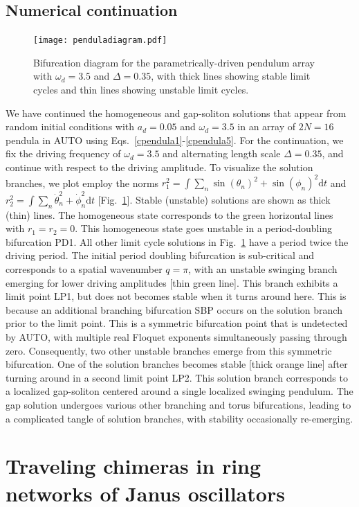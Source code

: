 \documentclass[aps,pre,amsmath,amssymb,floatfix,onecolumn,notitlepage,10pt]{revtex4-1}
\begin{document}
\subsection{Numerical continuation}
\begin{figure}[htb]
\texttt{[image: penduladiagram.pdf]}
\caption{Bifurcation diagram for the parametrically-driven pendulum array with $\omega_d=3.5$ and $\Delta=0.35$, with thick lines showing stable limit cycles and thin lines showing unstable limit cycles. \label{fig2}}
\end{figure}
We have continued the homogeneous and gap-soliton solutions that appear from random initial conditions with $a_d=0.05$ and $\omega_d=3.5$ in an array of $2N=16$ pendula in AUTO using Eqs.~\eqref{cpendula1}-\eqref{cpendula5}. For the continuation, we fix the driving frequency of $\omega_d=3.5$ and alternating length scale $\Delta=0.35$, and continue with respect to the driving amplitude. To visualize the solution branches, we plot employ the norms $r_1^2=\int\sum_n\sin(\theta_n)^2+\sin(\phi_n)^2 {\mathrm d}t$ and $r_2^2=\int\sum_n\dot{\theta}_n^2+\dot{\phi}_n^2 {\mathrm d}t$ [Fig.~\ref{fig2}]. Stable (unstable) solutions are shown as thick (thin) lines. The homogeneous state corresponds to the green horizontal lines with $r_1=r_2=0$. This homogeneous state goes unstable in a period-doubling bifurcation PD1. All other limit cycle solutions in Fig.~\ref{fig2} have a period twice the driving period. The initial period doubling bifurcation is sub-critical and corresponds to a spatial wavenumber $q=\pi$, with an unstable swinging branch emerging for lower driving amplitudes [thin green line]. This branch exhibits a limit point LP1, but does not becomes stable when it turns around here. This is because an additional branching bifurcation SBP occurs on the solution branch prior to the limit point. This is a symmetric bifurcation point that is undetected by AUTO, with multiple real Floquet exponents simultaneously passing through zero. Consequently, two other unstable branches emerge from this symmetric bifurcation. One of the solution branches becomes stable [thick orange line] after turning around in a second limit point LP2. This solution branch corresponds to a localized gap-soliton centered around a single localized swinging pendulum. The gap solution undergoes various other branching and torus bifurcations, leading to a complicated tangle of solution branches, with stability occasionally re-emerging.

\section{Traveling chimeras in ring networks of Janus oscillators}
\end{document}
